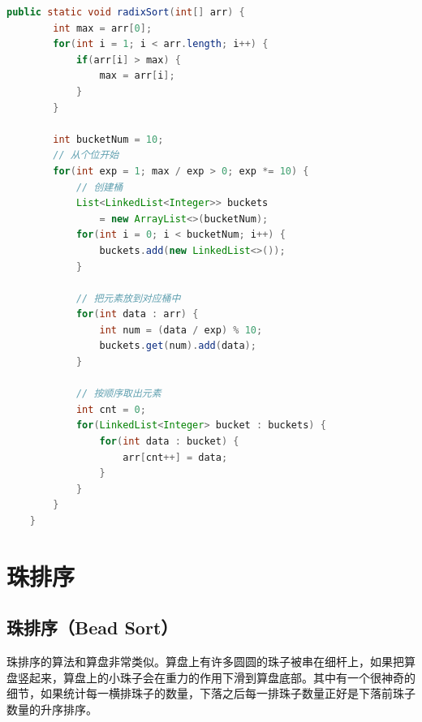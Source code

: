 
\begin{lstlisting}[language=Java]
public static void radixSort(int[] arr) {
        int max = arr[0];
        for(int i = 1; i < arr.length; i++) {
            if(arr[i] > max) {
                max = arr[i];
            }
        }

        int bucketNum = 10;
        // 从个位开始
        for(int exp = 1; max / exp > 0; exp *= 10) {
            // 创建桶
            List<LinkedList<Integer>> buckets 
                = new ArrayList<>(bucketNum);
            for(int i = 0; i < bucketNum; i++) {
                buckets.add(new LinkedList<>());
            }

            // 把元素放到对应桶中
            for(int data : arr) {
                int num = (data / exp) % 10;
                buckets.get(num).add(data);
            }

            // 按顺序取出元素
            int cnt = 0;
            for(LinkedList<Integer> bucket : buckets) {
                for(int data : bucket) {
                    arr[cnt++] = data;
                }
            }
        }
    }
\end{lstlisting}

\newpage

\section{珠排序}

\subsection{珠排序（Bead Sort）}

珠排序的算法和算盘非常类似。算盘上有许多圆圆的珠子被串在细杆上，如果把算盘竖起来，算盘上的小珠子会在重力的作用下滑到算盘底部。其中有一个很神奇的细节，如果统计每一横排珠子的数量，下落之后每一排珠子数量正好是下落前珠子数量的升序排序。

